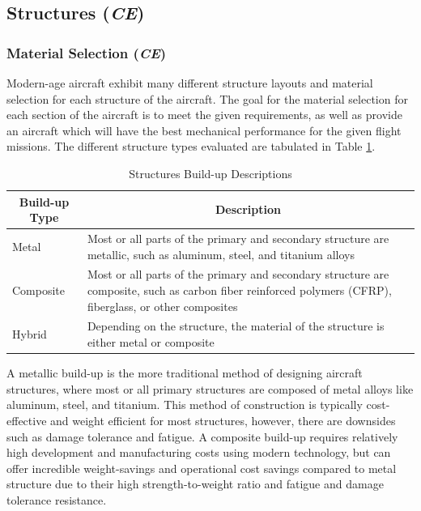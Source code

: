\subsection{Structures (\textit{CE})}
\subsubsection{Material Selection (\textit{CE})}
\label{section: strcuture material}
Modern-age aircraft exhibit many different structure layouts and material selection for each structure of the aircraft. The goal for the material selection for each section of the aircraft is to meet the given requirements, as well as provide an aircraft which will have the best mechanical performance for the given flight missions. The different structure types evaluated are tabulated in Table \ref{tab:structure_material_table}.

\begin{table}[!h]
\centering
\caption{Structures Build-up Descriptions }
\label{tab:structure_material_table}
\begin{tabular}{ |p{2cm}||p{13cm}| }
\toprule
\multicolumn{1}{|c||}{\textbf{Build-up Type}} & \multicolumn{1}{c|}{\textbf{Description}}                                                                                                                       \\ \hline\hline
Metal                                       & Most or all parts of the primary and secondary structure are metallic, such as aluminum, steel, and titanium alloys                                             \\ \hline
Composite                                    & Most or all parts of the primary and secondary structure are composite, such as carbon fiber reinforced polymers (CFRP), fiberglass, or other composites \\ \hline
Hybrid                                       & Depending on the structure, the material of the structure is either metal or composite                                                                            \\ \bottomrule
\end{tabular}
\end{table}

A metallic build-up is the more traditional method of designing aircraft structures, where most or all primary structures are composed of metal alloys like aluminum, steel, and titanium. This method of construction is typically cost-effective and weight efficient for most structures, however, there are downsides such as damage tolerance and fatigue. A composite build-up requires relatively high development and manufacturing costs using modern technology, but can offer incredible weight-savings and operational cost savings compared to metal structure due to their high strength-to-weight ratio and fatigue and damage tolerance resistance. 

